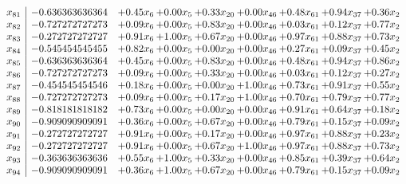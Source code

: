 \documentclass[8pt]{article}
\begin{document}
\[\begin{array}{c| c c@{\hskip 2pt} c@{\hskip 2pt} c@{\hskip 2pt} c@{\hskip 2pt} c@{\hskip 2pt} c@{\hskip 2pt} c@{\hskip 2pt} }
 x_{81}   &  -0.636363636364 & +  0.45 x_{6} & +  0.00 x_{5} & +  0.33 x_{20} & +  0.00 x_{46} & +  0.48 x_{61} & +  0.94 x_{37} & +  0.36 x_{2}\\
 x_{82}   &  -0.727272727273 & +  0.09 x_{6} & +  0.00 x_{5} & +  0.83 x_{20} & +  0.00 x_{46} & +  0.03 x_{61} & +  0.12 x_{37} & +  0.77 x_{2}\\
 x_{83}   &  -0.272727272727 & +  0.91 x_{6} & +  1.00 x_{5} & +  0.67 x_{20} & +  0.00 x_{46} & +  0.97 x_{61} & +  0.88 x_{37} & +  0.73 x_{2}\\
 x_{84}   &  -0.545454545455 & +  0.82 x_{6} & +  0.00 x_{5} & +  0.00 x_{20} & +  0.00 x_{46} & +  0.27 x_{61} & +  0.09 x_{37} & +  0.45 x_{2}\\
 x_{85}   &  -0.636363636364 & +  0.45 x_{6} & +  0.00 x_{5} & +  0.83 x_{20} & +  0.00 x_{46} & +  0.48 x_{61} & +  0.94 x_{37} & +  0.86 x_{2}\\
 x_{86}   &  -0.727272727273 & +  0.09 x_{6} & +  0.00 x_{5} & +  0.33 x_{20} & +  0.00 x_{46} & +  0.03 x_{61} & +  0.12 x_{37} & +  0.27 x_{2}\\
 x_{87}   &  -0.454545454546 & +  0.18 x_{6} & +  0.00 x_{5} & +  0.00 x_{20} & +  1.00 x_{46} & +  0.73 x_{61} & +  0.91 x_{37} & +  0.55 x_{2}\\
 x_{88}   &  -0.727272727273 & +  0.09 x_{6} & +  0.00 x_{5} & +  0.17 x_{20} & +  1.00 x_{46} & +  0.70 x_{61} & +  0.79 x_{37} & +  0.77 x_{2}\\
 x_{89}   &  -0.818181818182 & +  0.73 x_{6} & +  0.00 x_{5} & +  0.00 x_{20} & +  0.00 x_{46} & +  0.91 x_{61} & +  0.64 x_{37} & +  0.18 x_{2}\\
 x_{90}   &  -0.909090909091 & +  0.36 x_{6} & +  0.00 x_{5} & +  0.67 x_{20} & +  0.00 x_{46} & +  0.79 x_{61} & +  0.15 x_{37} & +  0.09 x_{2}\\
 x_{91}   &  -0.272727272727 & +  0.91 x_{6} & +  0.00 x_{5} & +  0.17 x_{20} & +  0.00 x_{46} & +  0.97 x_{61} & +  0.88 x_{37} & +  0.23 x_{2}\\
 x_{92}   &  -0.272727272727 & +  0.91 x_{6} & +  0.00 x_{5} & +  0.67 x_{20} & +  1.00 x_{46} & +  0.97 x_{61} & +  0.88 x_{37} & +  0.73 x_{2}\\
 x_{93}   &  -0.363636363636 & +  0.55 x_{6} & +  1.00 x_{5} & +  0.33 x_{20} & +  0.00 x_{46} & +  0.85 x_{61} & +  0.39 x_{37} & +  0.64 x_{2}\\
 x_{94}   &  -0.909090909091 & +  0.36 x_{6} & +  1.00 x_{5} & +  0.67 x_{20} & +  0.00 x_{46} & +  0.79 x_{61} & +  0.15 x_{37} & +  0.09 x_{2}\\

\end{array}\]
\end{document}
